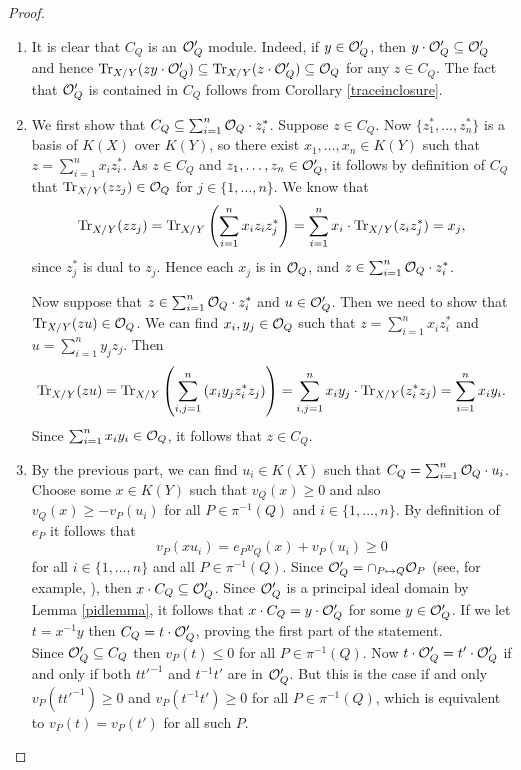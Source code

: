 \begin{proof}
 \begin{enumerate}
  \item It is clear that $C_Q$ is an ${\cal O}_Q'$ module.
	Indeed, if $y\in {\cal O}_Q'$, then $y\cdot {\cal O}_Q' \subseteq {\cal O}_Q'$ and hence $\operatorname{Tr}_{X/Y}(z y\cdot {\cal O}_Q')\subseteq \operatorname{Tr}_{X/Y}(z\cdot {\cal O}_Q') \subseteq {\cal O}_Q$ for any $z\in C_Q$.
	The fact that ${\cal O}_Q'$ is contained in $C_Q$ follows from Corollary \ref{traceinclosure}.
  \item We first show that $C_Q \subseteq \sum_{i=1}^n {\cal O}_Q\cdot z_i^*$.
	Suppose $z\in C_Q$.
	Now $\{z_1^*, \ldots ,z_n^*\}$ is a basis of $K(X)$ over $K(Y)$, so there exist $x_1,\ldots , x_n\in K(Y)$ such that $z=\sum_{i=1}^n x_iz_i^*$.
	As $z\in C_Q$ and $z_1,\ldots ,z_n\in {\cal O}_Q'$, it follows by definition of $C_Q$ that $\operatorname{Tr}_{X/Y}(zz_j)\in {\cal O}_Q$ for $j\in \{1,\ldots ,n\}$.
	We know that 
	\[
	 \operatorname{Tr}_{X/Y}(zz_j) = \operatorname{Tr}_{X/Y}\left(\sum_{i=1}^nx_iz_iz_j^*\right) = \sum_{i=1}^nx_i \cdot \operatorname{Tr}_{X/Y}(z_iz_j^*) = x_j,
	\]
	since $z_j^*$ is dual to $z_j$.
	Hence each $x_j$ is in ${\cal O}_Q$, and $z\in \sum_{i=1}^n{\cal O}_Q\cdot z_i^*$.
	
	Now suppose that $z\in \sum_{i=1}^n{\cal O}_Q\cdot z_i^*$ and $u\in {\cal O}_Q'$.
	Then we need to show that $\operatorname{Tr}_{X/Y}(z u)\in {\cal O}_Q$.
	We can find $x_i, y_j\in {\cal O}_Q$ such that $z=\sum_{i=1}^n x_iz_i^*$ and $u=\sum_{i=1}^ny_jz_j$.
	Then
	\[
	 \operatorname{Tr}_{X/Y}(zu) = \operatorname{Tr}_{X/Y}\left(\sum_{i,j=1}^n \left(x_iy_jz_i^*z_j\right)\right) = \sum_{i,j=1}^n x_iy_j\cdot \operatorname{Tr}_{X/Y}(z_i^*z_j) = \sum_{i=1}^n x_iy_i.
	\]
	Since $\sum_{i=1}^n x_iy_i\in {\cal O}_Q$, it follows that $z\in C_Q$.
  \item By the previous part, we can find $u_i\in K(X)$ such that $C_Q = \sum_{i=1}^n {\cal O}_Q \cdot u_i$.
	Choose some $x\in K(Y)$ such that $v_Q(x)\geq 0$ and also $v_Q(x)\geq -v_P(u_i)$ for all $P\in \pi^{-1}(Q)$ and $i\in \{1,\ldots ,n\}$.
	By definition of $e_P$ it follows that
	\[ v_P(xu_i) = e_Pv_Q(x) + v_P(u_i) \geq 0\]
	for all $i\in \{1,\ldots, n\}$ and all $P\in \pi^{-1}(Q)$.
	Since ${\cal O}'_Q = \cap_{P\mapsto Q} {\cal O}_P$ (see, for example, \cite[Cor. III.3.5]{stichtenoth}), then $x\cdot C_Q \subseteq {\cal O}_Q'$.
	Since ${\cal O}_Q'$ is a principal ideal domain by Lemma \ref{pidlemma}, it follows that $x\cdot C_Q = y\cdot {\cal O}_Q'$ for some $y\in {\cal O}_Q'$.
	If we let $t=x^{-1}y$ then $C_Q =t\cdot {\cal O}_Q'$, proving the first part of the statement.\\
	Since ${\cal O}_Q'\subseteq C_Q$ then $v_P(t)\leq 0$ for all $P\in \pi^{-1}(Q)$.
	Now $t\cdot {\cal O}_Q' = t'\cdot {\cal O}_Q'$ if and only if both $tt'^{-1}$ and $t^{-1}t'$ are in ${\cal O}_Q'$.
	But this is the case if and only $v_P(tt'^{-1}) \geq 0$ and $v_P(t^{-1}t')\geq 0$ for all $P\in \pi^{-1}(Q)$, which is equivalent to $v_P(t)=v_P(t')$ for all such $P$.
 \end{enumerate}
\end{proof}

